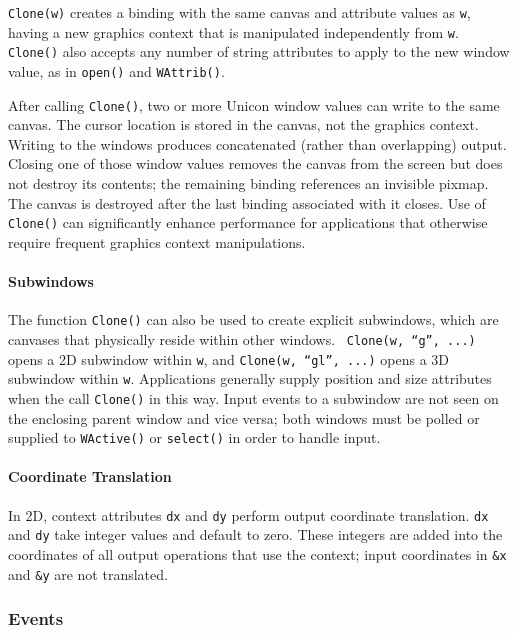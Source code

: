 \texttt{Clone(w)} creates a binding with the same canvas and attribute
values as \texttt{w}, having a new graphics context that is manipulated
independently from \texttt{w}. \texttt{Clone()} also accepts any number
of string attributes to apply to the new window value, as in
\texttt{open()} and \texttt{WAttrib()}.

After calling \texttt{Clone()}, two or more Unicon window values can
write to the same canvas. The cursor location is stored in the
canvas, not the graphics context. Writing to the windows produces
concatenated (rather than overlapping) output. Closing one of those
window values removes the canvas from the screen but does not destroy
its contents; the remaining binding references an invisible pixmap.
The canvas is destroyed after the last binding associated with it
closes. Use of \texttt{Clone()} can significantly enhance performance
for applications that otherwise require frequent graphics context
manipulations.

\paragraph{Subwindows}
The function \texttt{Clone()} can also be used to create explicit subwindows,
which are canvases that physically reside within other windows.
\ \texttt{Clone(w, {\textquotedblleft}g{\textquotedblright}, ...)}
opens a 2D subwindow within \texttt{w}, and \texttt{Clone(w,
{\textquotedblleft}gl{\textquotedblright}, ...)} opens a 3D subwindow
within \texttt{w}. Applications generally supply position and size
attributes when the call \texttt{Clone()} in this way. Input events
to a subwindow are not seen on the enclosing parent window and vice
versa; both windows must be polled or supplied to \texttt{WActive()} or
\texttt{select()} in order to handle input.

\paragraph{Coordinate Translation}
In 2D, context attributes \texttt{dx} and \texttt{dy} perform output
coordinate translation. \texttt{dx} and \texttt{dy} take integer values
and default to zero. These integers are added into the coordinates of
all output operations that use the context; input coordinates in
\texttt{\&x} and \texttt{\&y} are not translated.

\subsubsection{Events}

